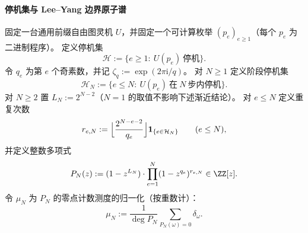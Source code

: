 \paragraph{停机集与 Lee--Yang 边界原子谱}
固定一台通用前缀自由图灵机 \(U\)，并固定一个可计算枚举 \((p_e)_{e\ge 1}\)（每个 \(p_e\) 为二进制程序）。
定义停机集
\[
\mathcal H:=\{e\ge 1:\ U(p_e)\ \text{停机}\}.
\]
令 \(q_e\) 为第 \(e\) 个奇素数，并记 \(\zeta_{q}:=\exp(2\pi \mathrm{i}/q)\)。
对 \(N\ge 1\) 定义阶段停机集
\[
\mathcal H_N:=\{e\le N:\ U(p_e)\ \text{在}\ N\ \text{步内停机}\}.
\]
对 \(N\ge 2\) 置 \(L_N:=2^{N-2}\)（\(N=1\) 的取值不影响下述渐近结论）。
对 \(e\le N\) 定义重复次数
\[
r_{e,N}:=
\Bigl\lfloor\frac{2^{N-e-2}}{q_e}\Bigr\rfloor\mathbf 1_{\{e\in\mathcal H_N\}}
\qquad(e\le N),
\]
并定义整数多项式
\[
P_N(z):=(1-z^{L_N})\cdot\prod_{e=1}^{N}(1-z^{q_e})^{r_{e,N}}\in\ZZ[z].
\]
令 \(\mu_N\) 为 \(P_N\) 的零点计数测度的归一化（按重数计）：
\[
\mu_N:=\frac1{\deg P_N}\sum_{P_N(\omega)=0}\delta_{\omega}.
\]


